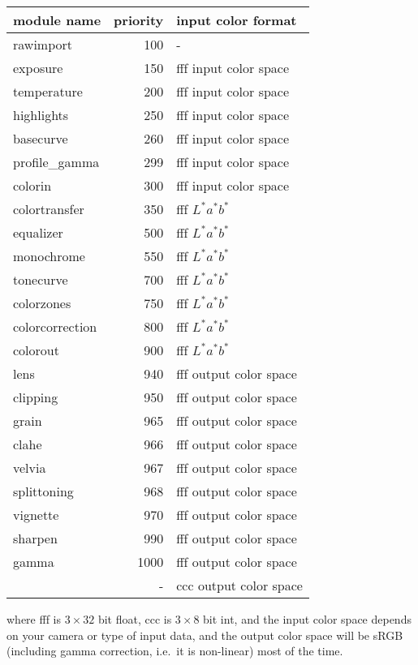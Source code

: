 \documentclass[a4paper,twoside]{scrartcl}
\begin{document}
\begin{tabular}{lrl}
module name & priority & input color format \\
\hline
rawimport      &  100  &  - \\
exposure       &  150  &  fff input color space \\
temperature    &  200  &  fff input color space \\
highlights     &  250  &  fff input color space \\
basecurve      &  260  &  fff input color space \\
profile\_gamma &  299  &  fff input color space \\
colorin        &  300  &  fff input color space \\
colortransfer  &  350  &  fff $L^*a^*b^*$ \\
equalizer      &  500  &  fff $L^*a^*b^*$ \\
monochrome     &  550  &  fff $L^*a^*b^*$ \\
tonecurve      &  700  &  fff $L^*a^*b^*$ \\
colorzones     &  750  &  fff $L^*a^*b^*$ \\
colorcorrection&  800  &  fff $L^*a^*b^*$ \\
colorout       &  900  &  fff $L^*a^*b^*$ \\
lens           &  940  &  fff output color space \\
clipping       &  950  &  fff output color space \\
grain          &  965  &  fff output color space \\
clahe          &  966  &  fff output color space \\
velvia         &  967  &  fff output color space \\
splittoning    &  968  &  fff output color space \\
vignette       &  970  &  fff output color space \\
sharpen        &  990  &  fff output color space \\
gamma          & 1000  &  fff output color space \\
               &   -   &  ccc output color space \\
\end{tabular}

\medskip

where fff is $3\times32$ bit float, ccc is $3\times8$ bit int, and the input
color space depends on your camera or type of input data, and the output color space will
be sRGB (including gamma correction, i.e.\ it is non-linear) most of the time.
\end{document}

